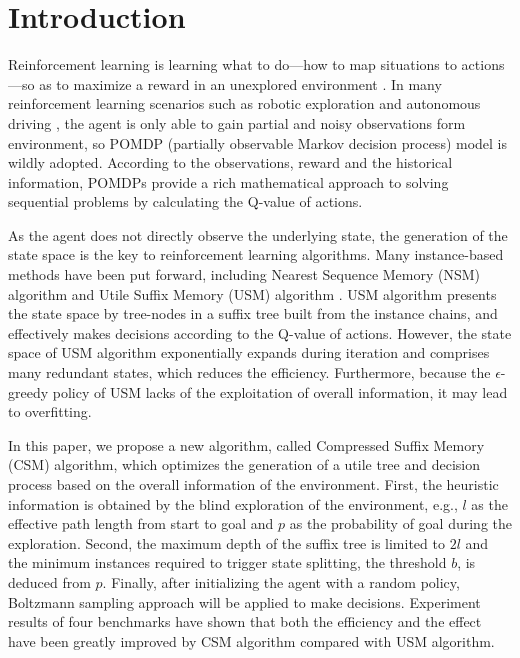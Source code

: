 \documentclass[conference]{IEEEtran}
\begin{document}
	
	\section{Introduction}
	
	Reinforcement learning is learning what to do—how to map situations to actions—so
	as to maximize a reward in an unexplored environment
	\cite{sutton2018reinforcement}. In many reinforcement learning scenarios such as
	robotic exploration \cite{smith2007probabilistic} and autonomous driving
	\cite{bai2015intention}, the agent is only able to gain partial and noisy
	observations form environment, so POMDP (partially observable Markov decision
	process) model is wildly adopted. According to the observations, reward and the
	historical information, POMDPs provide a rich mathematical approach to solving
	sequential problems by calculating the Q-value of actions.
	
	As the agent does not directly observe the underlying state, the generation of
	the state space is the key to reinforcement learning algorithms.
	Many instance-based methods have been put forward, including Nearest Sequence
	Memory (NSM) algorithm \cite{mccallum1997reinforcement} and Utile Suffix Memory
	(USM) algorithm \cite{mccallum1995instance}. USM algorithm presents the state space by
	tree-nodes in a suffix tree built from the instance chains, and effectively
	makes decisions according to the Q-value of actions. However, the state space of USM
	algorithm exponentially expands during iteration and comprises many redundant
	states, which reduces the efficiency. Furthermore, because the $\epsilon$-greedy
	policy of USM lacks of the exploitation of overall information, it may lead to
	overfitting.
	
	In this paper, we propose a new algorithm, called Compressed Suffix Memory (CSM)
	algorithm, which optimizes the generation of a utile tree and decision process based
	on the overall information of the environment. First, the heuristic information
	is obtained by the blind exploration of the environment, e.g., $l$ as the effective path
	length from start to goal and $p$ as the probability of goal during the exploration.
	Second, the maximum depth of the suffix tree is limited to $2l$ and the minimum instances required
	to trigger state splitting, the threshold $b$, is deduced from $p$. Finally, after initializing the agent
	with a random policy, Boltzmann sampling approach will be applied to make decisions. Experiment
	results of four benchmarks have shown that both the efficiency and the effect
	have been greatly improved by CSM algorithm compared with USM algorithm.
	
\end{document}
